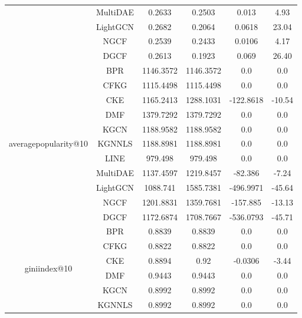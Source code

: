 \begin{table}[H]
{\begin{tabular}{|c|c|c|c|c|c|}
            & MultiDAE & 0.2633 & 0.2503 & 0.013    & 4.93    \\ \cline{2-6}
            & LightGCN & 0.2682 & 0.2064 & 0.0618   & 23.04   \\ \cline{2-6}
            & NGCF     & 0.2539 & 0.2433 & 0.0106   & 4.17    \\ \cline{2-6}
            & DGCF     & 0.2613 & 0.1923 & 0.069    & 26.40   \\ \hline
            \multirow{11}{*}{averagepopularity@10} 
            & BPR      & 1146.3572 & 1146.3572 & 0.0      & 0.0       \\ \cline{2-6}
            & CFKG     & 1115.4498 & 1115.4498 & 0.0      & 0.0       \\ \cline{2-6}
            & CKE      & 1165.2413 & 1288.1031 & -122.8618 & -10.54  \\ \cline{2-6}
            & DMF      & 1379.7292 & 1379.7292 & 0.0      & 0.0       \\ \cline{2-6}
            & KGCN     & 1188.9582 & 1188.9582 & 0.0      & 0.0       \\ \cline{2-6}
            & KGNNLS   & 1188.8981 & 1188.8981 & 0.0      & 0.0       \\ \cline{2-6}
            & LINE     & 979.498   & 979.498   & 0.0      & 0.0       \\ \cline{2-6}
            & MultiDAE & 1137.4597 & 1219.8457 & -82.386  & -7.24    \\ \cline{2-6}
            & LightGCN & 1088.741  & 1585.7381 & -496.9971 & -45.64 \\ \cline{2-6}
            & NGCF     & 1201.8831 & 1359.7681 & -157.885  & -13.13 \\ \cline{2-6}
            & DGCF     & 1172.6874 & 1708.7667 & -536.0793 & -45.71 \\ \hline
            \multirow{11}{*}{giniindex@10} 
            & BPR      & 0.8839 & 0.8839 & 0.0      & 0.0       \\ \cline{2-6}
            & CFKG     & 0.8822 & 0.8822 & 0.0      & 0.0       \\ \cline{2-6}
            & CKE      & 0.8894 & 0.92   & -0.0306  & -3.44   \\ \cline{2-6}
            & DMF      & 0.9443 & 0.9443 & 0.0      & 0.0       \\ \cline{2-6}
            & KGCN     & 0.8992 & 0.8992 & 0.0      & 0.0       \\ \cline{2-6}
            & KGNNLS   & 0.8992 & 0.8992 & 0.0      & 0.0       \\ \cline{2-6}

\end{tabular}}
\end{table}
